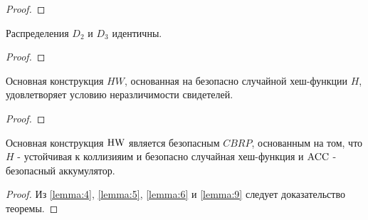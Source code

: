 \begin{proof}
\end{proof}

\begin{theorem}
	\label{lemma:12}
	Распределения $D_2$ и $D_3$ идентичны.
\end{theorem}

\begin{proof}
\end{proof}

\begin{theorem}
	\label{lemma:9}
	Основная конструкция $HW$, основанная на безопасно случайной хеш-функции $H$, удовлетворяет условию неразличимости свидетелей.
\end{theorem}

\begin{proof}
\end{proof}

\begin{theorem}
	\label{theorem:2}
	Основная конструкция $\text{HW}$ является безопасным $CBRP$, основанным на том, что $H$ - устойчивая к коллизияим и безопасно случайная хеш-функция и $\text{ACC}$ - безопасный аккумулятор.
\end{theorem}

\begin{proof}
	Из \ref{lemma:4}, \ref{lemma:5}, \ref{lemma:6} и \ref{lemma:9} следует доказательство теоремы.
\end{proof}
